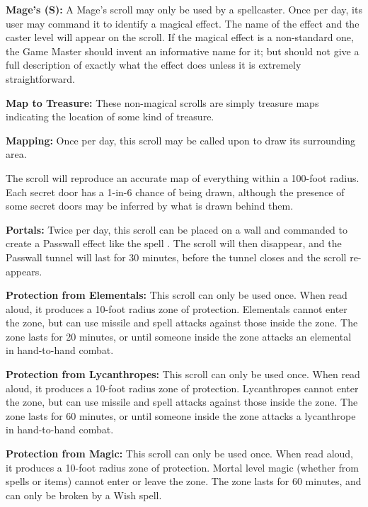 \begin{multicols*}{2}
\textbf{Mage’s (S):} A Mage’s scroll may only be used by a spellcaster. Once per day, its user may command it to identify a magical effect. The name of the effect and the caster level will appear on the scroll. If the magical effect is a non-standard one, the Game Master should invent an informative name for it; but should not give a full description of exactly what the effect does unless it is extremely straightforward.

\textbf{Map to Treasure:} These non-magical scrolls are simply treasure maps indicating the location of some kind of treasure.

\textbf{Mapping:} Once per day, this scroll may be called upon to draw its surrounding area.

The scroll will reproduce an accurate map of everything within a 100-foot radius. Each secret door has a 1-in-6 chance of being drawn, although the presence of some secret doors may be inferred by what is drawn behind them.

\textbf{Portals:} Twice per day, this scroll can be placed on a wall and commanded to create a Passwall effect like the spell . The scroll will then disappear, and the Passwall tunnel will last for 30 minutes, before the tunnel closes and the scroll re-appears.

\textbf{Protection from Elementals:} This scroll can only be used once. When read aloud, it produces a 10-foot radius zone of protection. Elementals cannot enter the zone, but can use missile and spell attacks against those inside the zone. The zone lasts for 20 minutes, or until someone inside the zone attacks an elemental in hand-to-hand combat.

\textbf{Protection from Lycanthropes:} This scroll can only be used once. When read aloud, it produces a 10-foot radius zone of protection. Lycanthropes cannot enter the zone, but can use missile and spell attacks against those inside the zone. The zone lasts for 60 minutes, or until someone inside the zone attacks a lycanthrope in hand-to-hand combat.

\textbf{Protection from Magic:} This scroll can only be used once. When read aloud, it produces a 10-foot radius zone of protection. Mortal level magic (whether from spells or items) cannot enter or leave the zone. The zone lasts for 60 minutes, and can only be broken by a Wish spell.


\end{multicols*}
